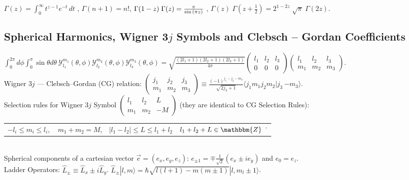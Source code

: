 \documentclass[10.5pt,letterpaper]{article}
\begin{document}
\noindent $\Gamma(z) = \int_0^\infty  t^{z-1} e^{-t}\,dt $ \space , \space $\Gamma(n+1)=n!$\space , \space $ \Gamma(1-z) \; \Gamma(z) = {\pi \over \sin{(\pi z)}} \,\! $ \space , \space  $\Gamma(z) \; \Gamma\left(z + \frac{1}{2}\right) = 2^{1-2z} \; \sqrt{\pi} \; \Gamma(2z). \,\! $


\subsection*{Spherical Harmonics, Wigner 3$j$ Symbols and Clebsch -- Gordan Coefficients}
$\int_0^{2 \pi} d\phi \int_0^{\pi} \sin \theta d\theta \ \mathcal{Y}_{l_1}^{m_1}(\theta,\phi) \mathcal{Y}_{l_2}^{m_2}(\theta,\phi) \mathcal{Y}_{l_3}^{m_3}(\theta,\phi)=\sqrt{\frac{(2l_1+1)(2l_2+1)(2l_3+1)}{4 \pi}} \begin{pmatrix}
  l_1 & l_2 & l_3\\
  0 & 0 & 0
\end{pmatrix}
\begin{pmatrix}
  l_1 & l_2 & l_3\\
  m_1 & m_2 & m_3
\end{pmatrix}
$.
\\

\noindent Wigner 3$j$ --- Clebsch--Gordan (CG) relation:
$
\begin{pmatrix}
  j_1 & j_2 & j_3\\
  m_1 & m_2 & m_3
\end{pmatrix}
\equiv \frac{(-1)^{j_1-j_2-m_3}}{\sqrt{2j_3+1}} \langle j_1 m_1 j_2 m_2 | j_3 \, {-m_3} \rangle.$\\

\noindent Selection rules for Wigner 3$j$ Symbol $\begin{pmatrix}  l_1 & l_2 & L\\   m_1 & m_2 & -M \end{pmatrix}$ (they are identical to CG Selection Rules):

\noindent 
\begin{tabular}{llll}
$-l_i \leq m_i \leq l_i, $ & $m_1+m_2=M$, & $|l_1-l_2|\leqslant L \leqslant l_1+l_2$ & $l_1+l_2+L \in \mathbbm{Z}$  \.\ 
\end{tabular}
\\

\noindent Spherical components of a cartesian vector $\vec e=(e_x,e_y,e_z)$: $e_{\pm 1}=\mp \frac{1}{\sqrt{2}} \left( e_x\pm i e_y \right)$ and $e_0=e_z$.\\

\noindent Ladder Operators: $ \hat L_{\pm}\equiv \hat L_x\pm i \hat L_y$. \space \space \space $\hat L_{\pm} |l,m \rangle=\hbar \sqrt{l(l+1)-m(m\pm1)}|l,m_l\pm1 \rangle$.
\end{document}
